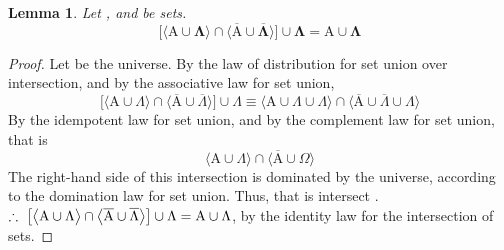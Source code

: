 \documentclass[preview]{standalone}
\newtheorem{lemma}{Lemma}
\begin{document}
\begin{lemma} %
    Let , and \bm{$\Lambda$} be sets.
    \begin{equation*}
        \bm{
            \bigg[
                \Big \langle \mathrm{A} \cup \Lambda \Big \rangle
                    \cap
                \Big \langle 
                    \overline{\mathrm{A}} 
                        \cup 
                    \overline{\Lambda} 
                \Big \rangle
            \bigg]
                \cup
            \Lambda
                =
            \mathrm{A} \cup \Lambda
        }
    \end{equation*}
\end{lemma}
\begin{proof}
    Let \bm{$\Omega$} be the universe.
    By the law of distribution for set union over intersection,
    and by the associative law for set union,
    \begin{equation*}
        \bigg[
            \Big \langle \mathrm{A} \cup \Lambda \Big \rangle
                \cap
            \Big \langle 
                \overline{\mathrm{A}} 
                    \cup 
                \overline{\Lambda} 
            \Big \rangle
        \Big]
            \cup
        \Lambda
            \equiv
        \Big \langle \mathrm{A} \cup \Lambda \cup \Lambda \Big \rangle
            \cap
        \Big \langle 
            \overline{\mathrm{A}} 
                \cup 
            \overline{\Lambda} 
                \cup
            \Lambda
        \Big \rangle
    \end{equation*}
    By the idempotent law for set union, 
    and by the complement law for set union, that is
    \begin{equation*}
        \Big \langle \mathrm{A} \cup \Lambda \Big \rangle
            \cap
        \Big \langle 
            \overline{\mathrm{A}} 
                \cup 
            \Omega
        \Big \rangle
    \end{equation*}
    The right-hand side of this intersection is dominated by the universe,
    according to the domination law for set union. Thus, that is
     intersect \bm{$\Omega$}.
    $\therefore \text{\space} \relax{
    \big[
        \big \langle \mathrm{A} \cup \Lambda \big \rangle
            \cap
        \big \langle 
            \overline{\mathrm{A}} 
                \cup 
            \overline{\Lambda} 
        \big \rangle
    \big]
        \cup
    \Lambda
        =
    \mathrm{A} \cup \Lambda
    }$, by the identity law for the intersection of sets.
\end{proof}
\end{document}
